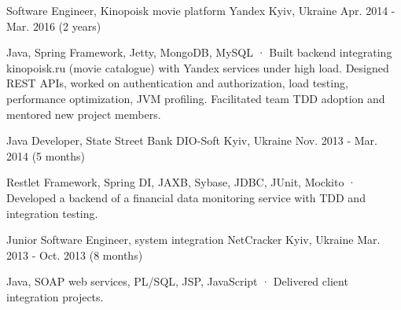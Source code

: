 \begin{cventries}
  \cventry
    {Software Engineer, Kinopoisk movie platform} %
    {Yandex} %
    {Kyiv, Ukraine} %
    {Apr. 2014 - Mar. 2016 (2 years)} %
    {
      \begin{cvitems} %
        \item {Java, Spring Framework, Jetty, MongoDB, MySQL · Built backend integrating kinopoisk.ru (movie catalogue) with Yandex services under high load. Designed REST APIs, worked on authentication and authorization, load testing, performance optimization, JVM profiling. Facilitated team TDD adoption and mentored new project members.}
      \end{cvitems}
    }

  \cventry
    {Java Developer, State Street Bank} %
    {DIO-Soft} %
    {Kyiv, Ukraine} %
    {Nov. 2013 - Mar. 2014 (5 months)} %
    {
      \begin{cvitems} %
        \item {Restlet Framework, Spring DI, JAXB, Sybase, JDBC, JUnit, Mockito · Developed a backend of a financial data monitoring service with TDD and integration testing.}
      \end{cvitems}
    }

  \cventry
    {Junior Software Engineer, system integration} %
    {NetCracker} %
    {Kyiv, Ukraine} %
    {Mar. 2013 - Oct. 2013 (8 months)} %
    {
      \begin{cvitems} %
        \item {Java, SOAP web services, PL/SQL, JSP, JavaScript · Delivered client integration projects.}
      \end{cvitems}
    }

\end{cventries}
